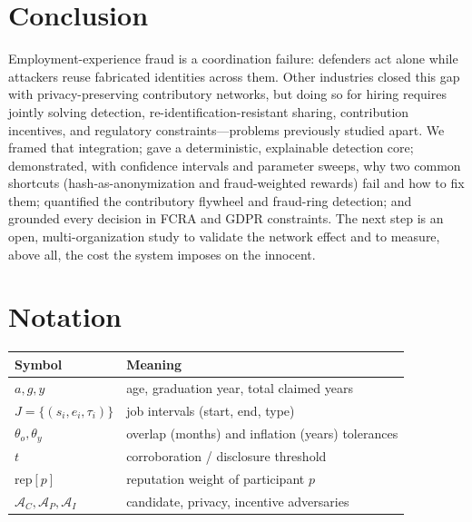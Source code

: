 \documentclass[11pt]{article}
\begin{document}
\section{Conclusion}\label{sec:conclusion}
Employment-experience fraud is a coordination failure: defenders act alone while
attackers reuse fabricated identities across them. Other industries closed this
gap with privacy-preserving contributory networks, but doing so for hiring
requires jointly solving detection, re-identification-resistant sharing,
contribution incentives, and regulatory constraints---problems previously studied
apart. We framed that integration; gave a deterministic, explainable detection
core; demonstrated, with confidence intervals and parameter sweeps, why two common
shortcuts (hash-as-anonymization and fraud-weighted rewards) fail and how to fix
them; quantified the contributory flywheel and fraud-ring detection; and grounded
every decision in FCRA and GDPR constraints. The next step is an open,
multi-organization study to validate the network effect and to measure, above
all, the cost the system imposes on the innocent.




\appendix
\section{Notation}\label{app:notation}
\begin{table}[h]\centering\small
\begin{tabular}{ll}
\toprule
Symbol & Meaning \\
\midrule
$a,g,y$ & age, graduation year, total claimed years \\
$J=\{(s_i,e_i,\tau_i)\}$ & job intervals (start, end, type) \\
$\theta_o,\theta_y$ & overlap (months) and inflation (years) tolerances \\
$t$ & corroboration / disclosure threshold \\
$\mathrm{rep}[p]$ & reputation weight of participant $p$ \\
$\mathcal{A}_C,\mathcal{A}_P,\mathcal{A}_I$ & candidate, privacy, incentive adversaries \\
\bottomrule
\end{tabular}
\end{table}
\end{document}
